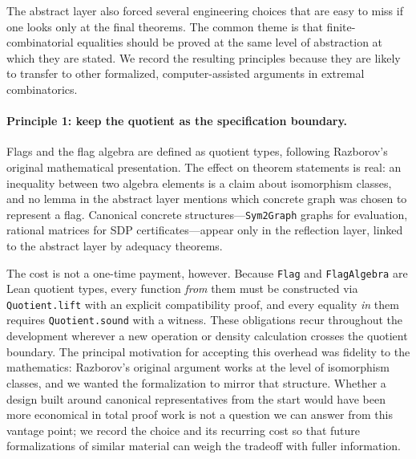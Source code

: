 \documentclass{article}
\newcommand{\lean}[1]{\texttt{#1}}
\begin{document}
The abstract layer also forced several engineering choices that are easy to
miss if one looks only at the final theorems.  The common theme is that
finite-combinatorial equalities should be proved at the same level of
abstraction at which they are stated.  We record the resulting principles
because they are likely to transfer to other formalized, computer-assisted
arguments in extremal combinatorics.

\paragraph{Principle 1: keep the quotient as the specification boundary.}
Flags and the flag algebra are defined as quotient types, following Razborov's
original mathematical presentation.  The effect on theorem statements is real:
an inequality between two algebra elements is a claim about isomorphism
classes, and no lemma in the abstract layer mentions which concrete graph was
chosen to represent a flag.  Canonical concrete structures---\lean{Sym2Graph}
graphs for evaluation, rational matrices for SDP certificates---appear only in
the reflection layer, linked to the abstract layer by adequacy theorems.

The cost is not a one-time payment, however.  Because \lean{Flag} and
\lean{FlagAlgebra} are Lean quotient types, every function \emph{from} them
must be constructed via \lean{Quotient.lift} with an explicit compatibility
proof, and every equality \emph{in} them requires \lean{Quotient.sound} with
a witness.  These obligations recur throughout the development wherever a new
operation or density calculation crosses the quotient boundary.  The principal
motivation for accepting this overhead was fidelity to the mathematics:
Razborov's original argument works at the level of isomorphism classes, and
we wanted the formalization to mirror that structure.  Whether a design built
around canonical representatives from the start would have been more economical
in total proof work is not a question we can answer from this vantage point; we
record the choice and its recurring cost so that future formalizations of
similar material can weigh the tradeoff with fuller information.
\end{document}
